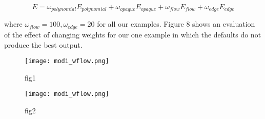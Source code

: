 \begin{equation}
E=\omega_{polynomial}E_{polynomial}+\omega_{opaque}E_{opaque}+\omega_{flow}E_{flow}+\omega_{edge}E_{edge}
\label{eq:layer_sum}
\end{equation} 

where $\omega_{flow}=100, \omega_{edge}=20 $ for all our examples. Figure 8 shows an evaluation of the effect of changing weights for our one example in which the defaults do not produce
the best output.
 
\begin{figure}[!htb]
 
	\begin{minipage}[t]{0.5\linewidth}
		\centering
		\texttt{[image: modi\_wflow.png]}
		\caption{fig1}
		\label{fig:side:a}
	\end{minipage}%
	\begin{minipage}[t]{0.5\linewidth}
		\centering
		\texttt{[image: modi\_wflow.png]}
		\caption{fig2}
		\label{fig:side:b}
	\end{minipage}
 
%
%	
%	
\end{figure}














